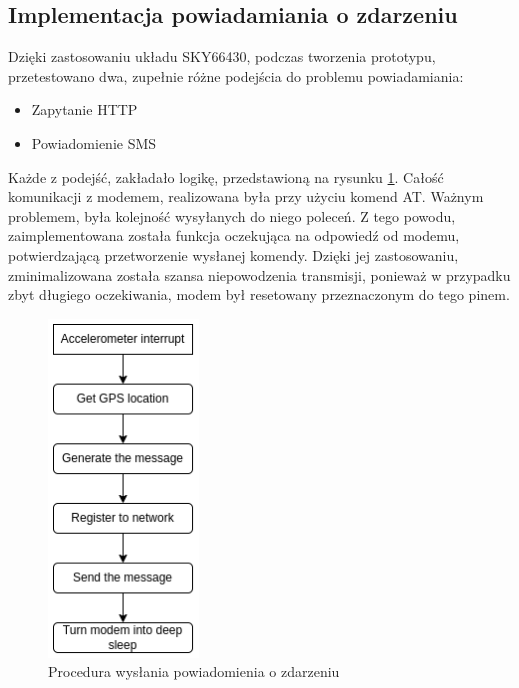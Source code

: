\subsection{Implementacja powiadamiania o zdarzeniu}
Dzięki zastosowaniu układu SKY66430, podczas tworzenia prototypu, przetestowano dwa, zupełnie różne podejścia do problemu powiadamiania:
\begin{itemize}
    \item Zapytanie HTTP
    \item Powiadomienie SMS
\end{itemize}
Każde z podejść, zakładało logikę, przedstawioną na rysunku \ref{img:lte_diagram}. Całość komunikacji z modemem, realizowana była przy użyciu komend AT. Ważnym problemem, była kolejność wysyłanych do niego poleceń. Z tego powodu, zaimplementowana została funkcja oczekująca na odpowiedź od modemu, potwierdzającą przetworzenie wysłanej komendy. Dzięki jej zastosowaniu, zminimalizowana została szansa niepowodzenia transmisji, ponieważ w przypadku zbyt długiego oczekiwania, modem był resetowany przeznaczonym do tego pinem.
\begin{figure}[t]
    \centering
    \includegraphics[width=4cm]{Graphics/LTE.png}
    \caption{Procedura wysłania powiadomienia o zdarzeniu}
    \label{img:lte_diagram}
\end{figure}

